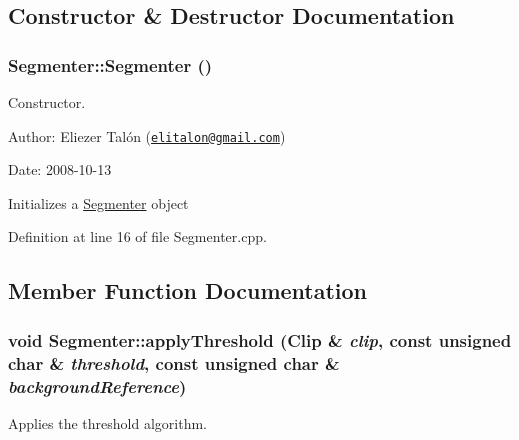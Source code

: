 \subsection{Constructor \& Destructor Documentation}
\hypertarget{class_segmenter_d39ec3bda31be180820aa0bdca7b125d}{
\subsubsection[Segmenter]{\setlength{\rightskip}{0pt plus 5cm}Segmenter::Segmenter ()}}
\label{class_segmenter_d39ec3bda31be180820aa0bdca7b125d}


Constructor. 

\begin{Desc}
\item[Author:]Eliezer Talón (\href{mailto:elitalon@gmail.com}{\tt elitalon@gmail.com}) \end{Desc}
\begin{Desc}
\item[Date:]2008-10-13\end{Desc}
Initializes a \hyperlink{class_segmenter}{Segmenter} object 

Definition at line 16 of file Segmenter.cpp.

\subsection{Member Function Documentation}
\hypertarget{class_segmenter_6854315e3320f9d9a8ece14cbb8570ee}{
\subsubsection[applyThreshold]{\setlength{\rightskip}{0pt plus 5cm}void Segmenter::applyThreshold ({\bf Clip} \& {\em clip}, \/  const unsigned char \& {\em threshold}, \/  const unsigned char \& {\em backgroundReference})}}
\label{class_segmenter_6854315e3320f9d9a8ece14cbb8570ee}


Applies the threshold algorithm. 

